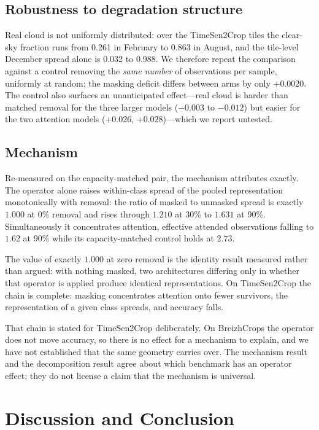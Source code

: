 \documentclass[journal]{IEEEtran}
\begin{document}
\subsection{Robustness to degradation structure}
Real cloud is not uniformly distributed: over the TimeSen2Crop tiles the
clear-sky fraction runs from 0.261 in February to 0.863 in August, and the
tile-level December spread alone is 0.032 to 0.988. We therefore repeat the
comparison against a control removing the
\emph{same number} of observations per sample, uniformly at random; the masking
deficit differs between arms by only $+0.0020$. The control also surfaces an
unanticipated effect---real cloud is harder than matched removal for the three
larger models ($-0.003$ to $-0.012$) but easier for the two attention models
($+0.026$, $+0.028$)---which we report untested.

\subsection{Mechanism}
\label{sec:mech}
Re-measured on the capacity-matched pair, the mechanism attributes exactly.
The operator alone raises within-class spread of the pooled representation
monotonically with removal: the ratio of masked to unmasked spread is exactly
$1.000$ at 0\% removal and rises through $1.210$ at 30\% to $\mathbf{1.631}$ at
90\%. Simultaneously it concentrates attention, effective attended observations
falling to $1.62$ at 90\% while its capacity-matched control holds at $2.73$.

The value of exactly $1.000$ at zero removal is the identity result measured
rather than argued: with nothing masked, two architectures differing only in
whether that operator is applied produce identical representations. On
TimeSen2Crop the chain is complete: masking concentrates attention onto fewer
survivors, the representation of a given class spreads, and accuracy falls.

That chain is stated for TimeSen2Crop deliberately. On BreizhCrops the operator
does not move accuracy, so there is no effect for a mechanism to explain, and we
have not established that the same geometry carries over. The mechanism result
and the decomposition result agree about which benchmark has an operator effect;
they do not license a claim that the mechanism is universal.

\section{Discussion and Conclusion}
\end{document}
